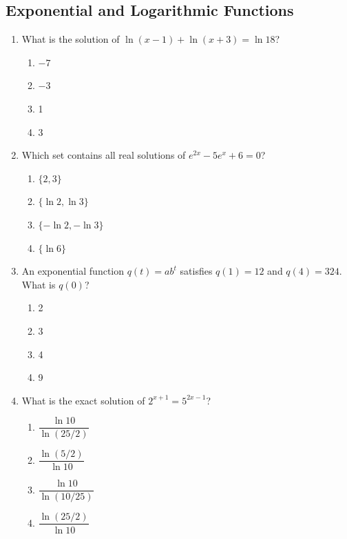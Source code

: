 \documentclass[12pt]{article}
\begin{document}
\subsection*{Exponential and Logarithmic Functions}
\begin{enumerate}[leftmargin=*,itemsep=1em,resume]
  \item What is the solution of $\ln(x-1)+\ln(x+3)=\ln18$?
  \begin{enumerate}[label=\Alph*.,itemsep=0pt]
    \item $-7$ \item $-3$ \item 1 \item 3
  \end{enumerate}

  \item Which set contains all real solutions of $e^{2x}-5e^x+6=0$?
  \begin{enumerate}[label=\Alph*.,itemsep=0pt]
    \item $\{2,3\}$ \item $\{\ln2,\ln3\}$
    \item $\{-\ln2,-\ln3\}$ \item $\{\ln6\}$
  \end{enumerate}

  \item An exponential function $q(t)=ab^t$ satisfies $q(1)=12$ and $q(4)=324$. What is $q(0)$?
  \begin{enumerate}[label=\Alph*.,itemsep=0pt]
    \item 2 \item 3 \item 4 \item 9
  \end{enumerate}

  \item What is the exact solution of $2^{x+1}=5^{2x-1}$?
  \begin{enumerate}[label=\Alph*.,itemsep=0pt]
    \item $\dfrac{\ln10}{\ln(25/2)}$
    \item $\dfrac{\ln(5/2)}{\ln10}$
    \item $\dfrac{\ln10}{\ln(10/25)}$
    \item $\dfrac{\ln(25/2)}{\ln10}$
  \end{enumerate}
\end{enumerate}
\end{document}

